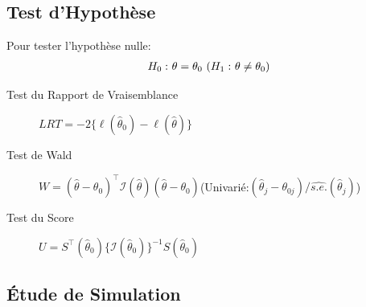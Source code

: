 \documentclass[10pt,  xcolors={RGB}, hyperref={%
    pdfpagelabels=false,
    colorlinks=true,
    pdftex=true,
    bookmarks=true,
    bookmarksopen=true,
    hyperfootnotes=true}]{beamer}
\begin{document}
\subsection{Test d'Hypothèse}
\begin{frame}{\subsecname}
Pour tester l'hypothèse nulle: \begin{gather*}\textcolor{black}{H_0:}\ \theta=\theta_0\ \textcolor{black}{(H_1:}\ \theta\neq\theta_0\textcolor{black}{)}\end{gather*}
\begin{description}
	\item[Test du Rapport de Vraisemblance] $LRT=-2\{\ell(\hat{\theta}_0)-\ell(\hat{\theta})\}$
	\item[Test de Wald] $W=(\hat{\theta}-\theta_0)^\top \mathcal{I}(\hat{\theta})(\hat{\theta}-\theta_0)$\quad (Univarié:$(\hat{\theta}_j-\theta_{0j})/\widehat{s.e.}(\hat{\theta}_j)$)
	\item[Test du Score] $U=S^\top(\hat{\theta}_0)\{\mathcal{I}(\hat{\theta}_0)\}^{-1}S(\hat{\theta}_0)$
\end{description}
\end{frame}

\subsection{\'Etude de Simulation}
\end{document}
